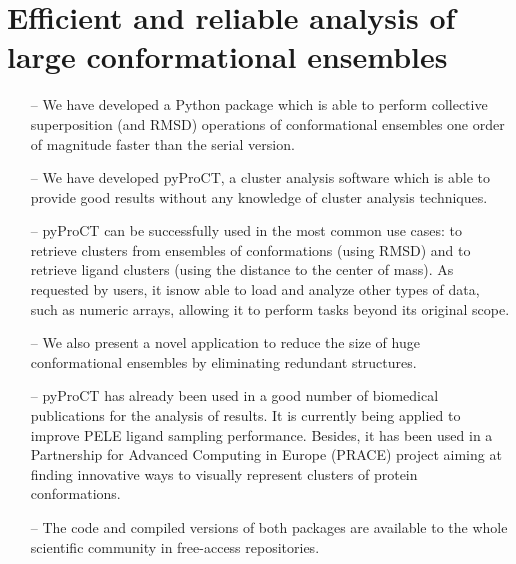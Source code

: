 \section[Efficient and reliable analysis]{Efficient and reliable analysis of large conformational ensembles}
\begin{itemize}
\item[--] We have developed a Python package which is able to perform collective superposition (and RMSD) operations of conformational ensembles one order of magnitude faster than the serial version.  
\item[--] We have developed pyProCT, a cluster analysis software which is able to provide good results without any knowledge of cluster analysis techniques.
\item[--] pyProCT can be successfully used in the most common use cases: to retrieve clusters from ensembles of conformations (using RMSD) and to retrieve ligand clusters (using the distance to the center of mass). As requested by users, it isnow able to load and analyze other types of data, such as numeric arrays, allowing it to perform tasks beyond its original scope.  
\item[--] We also present a novel application to reduce the size of huge conformational ensembles by eliminating redundant structures. 
\item[--] pyProCT has already been used in a good number of biomedical publications for the analysis of results. It is currently being applied to improve PELE ligand sampling performance. Besides, it has been used in a Partnership for Advanced Computing in Europe (PRACE) project aiming at finding innovative ways to visually represent clusters of protein conformations.
\item[--] The code and compiled versions of both packages are available to the whole scientific community in free-access repositories. 
\end{itemize}




\newpage



